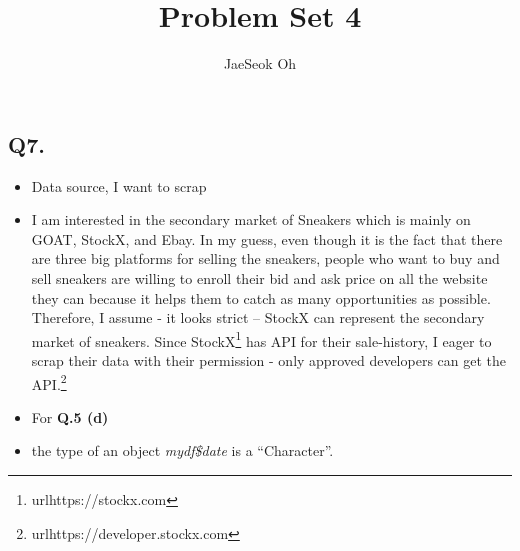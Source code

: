 \documentclass{article}
\title{Problem Set 4}
\author{JaeSeok Oh}
\begin{document}
\maketitle

\begin{large}
\section*{Q7.}

\begin{itemize}
    \item Data source, I want to scrap
    \item[] I am interested in the secondary market of Sneakers which is mainly on GOAT, StockX, and Ebay. In my guess, even though it is the fact that there are three big platforms for selling the sneakers, people who want to buy and sell sneakers are willing to enroll their bid and ask price on all the website they can because it helps them to catch as many opportunities as possible. Therefore, I assume - it looks strict -- StockX can represent the secondary market of sneakers. Since StockX\footnote{url{https://stockx.com}} has API for their sale-history, I eager to scrap their data with their permission - only approved developers can get the API.\footnote{url{https://developer.stockx.com}}
    \item For \textbf{Q.5 (d)}
    \item[] the type of an object \textit{mydf\$date} is a ``Character''.
\end{itemize}


\vspace{5cm}





\end{large}
\end{document}
